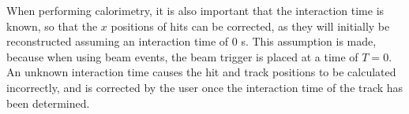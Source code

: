 When performing calorimetry, it is also important that the interaction time is known, so that the $x$ positions of hits can be corrected, as they will initially be reconstructed assuming an interaction time of 0 s. This assumption is made, because when using beam events, the beam trigger is placed at a time of $T = 0$. An unknown interaction time causes the hit and track positions to be calculated incorrectly, and is corrected by the user once the interaction time of the track has been determined. 
